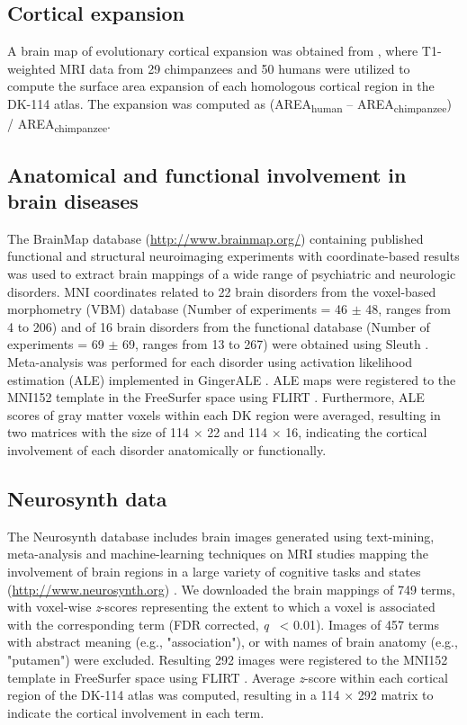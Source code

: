 \begin{refsection}
\subsection*{Cortical expansion}
A brain map of evolutionary cortical expansion was obtained from \citep{Wei2019GeneticMA}, where T1-weighted MRI data from 29 chimpanzees and 50 humans were utilized to compute the surface area expansion of each homologous cortical region in the DK-114 atlas. The expansion was computed as (AREA\textsubscript{human} – AREA\textsubscript{chimpanzee}) / AREA\textsubscript{chimpanzee}. 

\subsection*{Anatomical and functional involvement in brain diseases}
The BrainMap database (\url{http://www.brainmap.org/}) containing published functional and structural neuroimaging experiments with coordinate-based results was used to extract brain mappings of a wide range of psychiatric and neurologic disorders. MNI coordinates related to 22 brain disorders from the voxel-based morphometry (VBM) database (Number of experiments = 46 $\mathsf{\pm}$ 48, ranges from 4 to 206) and of 16 brain disorders from the functional database (Number of experiments = 69 $\mathsf{\pm}$ 69, ranges from 13 to 267) were obtained using Sleuth \citep{Fox2005BrainMapTO,Fox2002MappingCA,Laird2005BrainMapT,Vanasse2018BrainMapVA}. Meta-analysis was performed for each disorder using activation likelihood estimation (ALE) implemented in GingerALE \citep{Eickhoff2009CoordinatebasedAL,Turkeltaub2012MinimizingWA}. ALE maps were registered to the MNI152 template in the FreeSurfer space using FLIRT \citep{JENKINSON2001143,JENKINSON2002825}. Furthermore, ALE scores of gray matter voxels within each DK region were averaged, resulting in two matrices with the size of 114 × 22 and 114 × 16, indicating the cortical involvement of each disorder anatomically or functionally.

\subsection*{Neurosynth data}
The Neurosynth database includes brain images generated using text-mining, meta-analysis and machine-learning techniques on MRI studies mapping the involvement of brain regions in a large variety of cognitive tasks and states (\url{http://www.neurosynth.org}) \citep{Yarkoni2011LargescaleAS}. We downloaded the brain mappings of 749 terms, with voxel-wise \textit{z}-scores representing the extent to which a voxel is associated with the corresponding term (FDR corrected, \textit{q} \ < 0.01). Images of 457 terms with abstract meaning (e.g., "association"), or with names of brain anatomy (e.g., "putamen") were excluded. Resulting 292 images were registered to the MNI152 template in FreeSurfer space using FLIRT \citep{JENKINSON2001143,JENKINSON2002825}. Average \textit{z}-score within each cortical region of the DK-114 atlas was computed, resulting in a 114 × 292 matrix to indicate the cortical involvement in each term.


\end{refsection}
